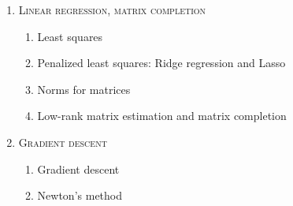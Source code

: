 \begin{enumerate}[label=\textbf{\arabic*.}]
\begin{enumerate}[label=\arabic*.,noitemsep]
\end{enumerate}
\item \textsc{Linear regression, matrix completion}
\vspace{-0.2cm}
\begin{enumerate}[label=\arabic*.,noitemsep]
\item Least squares
\item Penalized least squares: Ridge regression and Lasso
\item Norms for matrices
\item Low-rank matrix estimation and matrix completion
\end{enumerate}
\item \textsc{Gradient descent}
\vspace{-0.2cm}
\begin{enumerate}[label=\arabic*.,noitemsep]
\item Gradient descent
\item Newton's method
\end{enumerate}
\end{enumerate}

